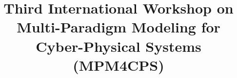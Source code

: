 
\newif\iflncs
\lncstrue

\iflncs
    
\else
    
\fi




\title{Third International Workshop on Multi-Paradigm Modeling for Cyber-Physical Systems ({MPM4CPS})}
\iflncs
\fi

\iflncs
    \author{}
    \institute{}
\else
    \author{Eugene Syriani}
    \affiliation{%
      \institution{Universit\'e de Montr\'eal}
      \country{Canada}
    }
    \email{syriani@iro.umontreal.ca}
    
    \author{Manuel Wimmer}
    \affiliation{%
      \institution{JKU Linz}
      \country{Austria}
    }
    \email{wimmer@big.tuwien.ac.at}
    
    \author{Dominique Blouin}
    \affiliation{%
        \institution{T\'el\'ecom ParisTech}
        \country{France}
    }
    \email{dominique.blouin@telecom-paristech.fr}
    
    \author{Moussa Amrani}
    \affiliation{%
        \institution{Universit\'e de Namur}
        \country{Belgium}
    }
    \email{Moussa.Amrani@unamur.be}
    
    \author{Julien Deantoni}
    \affiliation{%
        \institution{Universit\'e Nice - Sophia Antipolis}
        \country{France}
    }
    \email{julien.deantoni@univ-cotedazur.fr}
    
    \author{Hans Vangheluwe}
    \affiliation{%
      \institution{University of Antwerp - Flanders Make vzw}
    }
    \affiliation{%
        \institution{McGill University}
        \country{Canada}
    }
    \email{hans.vangheluwe@uantwerpen.be}
 
    \author{Pieter Mosterman}
    \affiliation{%
      \institution{The Mathworks}
    }
    \email{Pieter.Mosterman@mathworks.com}
   
    \author{Jeff Gray}
    \affiliation{%
        \institution{University of Alabama }
        \country{USA}
    }
    \email{gray@cs.ua.edu}
    
    \author{Vasco Amaral}
    \affiliation{%
        \institution{Universidade NOVA de Lisboa}
        \country{Portugal}
    }
    \email{vasco.amaral@fct.unl.pt}
    \renewcommand{\shortauthors}{Van Mierlo, Syriani, Wimmer, Blouin, Amrani, Deantoni, Vangheluwe, Gray, Amaral}
\fi

